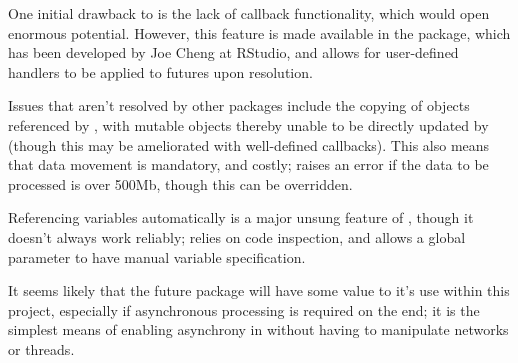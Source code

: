 One initial drawback to  is the lack of callback functionality,
which would open enormous potential. However, this feature is made
available in the  package, which has been developed by
Joe Cheng at RStudio, and allows for user-defined handlers to be
applied to futures upon resolution\cite{Cheng19}.

Issues that aren't resolved by other packages include the copying of
objects referenced by , with mutable objects thereby unable to be
directly updated by  (though this may be ameliorated with
well-defined callbacks). This also means that data movement is
mandatory, and costly;  raises an error if the data to be
processed is over 500Mb, though this can be overridden.

Referencing variables automatically is a major unsung feature of ,
though it doesn't always work reliably;  relies on code
inspection, and allows a global parameter to have manual
variable specification.

It seems likely that the future package will have some value to it's
use within this project, especially if asynchronous processing is required on the \R end; it
is the simplest means of enabling asynchrony in \R without having to
manipulate networks or threads.
